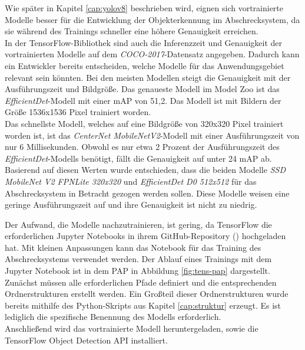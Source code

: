 Wie später in Kapitel \ref{cap:yolov8} beschrieben wird, eignen sich vortrainierte Modelle besser für die Entwicklung der Objekterkennung im Abschrecksystem, da sie während des Trainings schneller eine höhere Genauigkeit erreichen.
\\
In der TensorFlow-Bibliothek sind auch die Inferenzzeit und Genauigkeit der vortrainierten Modelle auf dem \textit{COCO-2017}-Datensatz angegeben. Dadurch kann ein Entwickler bereits entscheiden, welche Modelle für das Anwendungsgebiet relevant sein könnten. Bei den meisten Modellen steigt die Genauigkeit mit der Ausführungszeit und Bildgröße.  Das genaueste Modell im Model Zoo ist das \textit{EfficientDet}-Modell mit einer \ac{mAP} von 51,2. Das Modell ist mit Bildern der Größe 1536x1536 Pixel trainiert worden.
\\
Das schnellste Modell, welches auf eine Bildgröße von 320x320 Pixel trainiert worden ist, ist das \textit{CenterNet MobileNetV2}-Modell mit einer Ausführungszeit von nur 6 Millisekunden. Obwohl es nur etwa 2 Prozent der Ausführungszeit des \textit{EfficientDet}-Modells benötigt, fällt die Genauigkeit auf unter 24 \ac{mAP} ab.
\\
Basierend auf diesen Werten wurde entschieden, dass die beiden Modelle \textit{SSD MobileNet V2 FPNLite 320x320} und \textit{EfficientDet D0 512x512} für das Abschrecksystem in Betracht gezogen werden sollen. Diese Modelle weisen eine geringe Ausführungszeit auf und ihre Genauigkeit ist nicht zu niedrig. \cite{tens_zoo}


Der Aufwand, die Modelle nachzutrainieren, ist gering, da TensorFlow die erforderlichen Jupyter Notebooks in ihrem GitHub-Repository (\cite{tens_zoo}) hochgeladen hat. Mit kleinen Anpassungen kann das Notebook für das Training des Abschrecksystems verwendet werden. Der Ablauf eines Trainings mit dem Jupyter Notebook ist in dem \ac{PAP} in Abbildung \ref{fig:tens-pap} dargestellt.
\\
Zunächst müssen alle erforderlichen Pfade definiert und die entsprechenden Ordnerstrukturen erstellt werden. Ein Großteil dieser Ordnerstrukturen wurde bereits mithilfe des Python-Skripts aus Kapitel \ref{cap:struktur} erzeugt. Es ist lediglich die spezifische Benennung des Modells erforderlich.
\\
Anschließend wird das vortrainierte Modell heruntergeladen, sowie die TensorFlow Object Detection API installiert.


